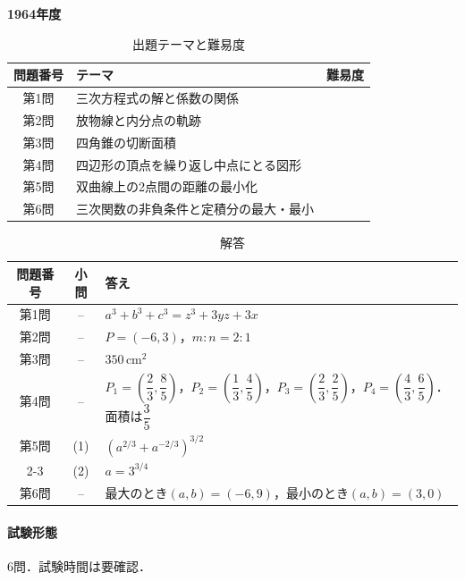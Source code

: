 \documentclass[../../main.tex]{subfiles}
\begin{document}
\begin{center}
  {\fontsize{48pt}{58pt}\selectfont \textbf{1964}\normalsize\textbf{年度}}
\end{center}

\begin{table}[htb]
  \centering
  \caption{出題テーマと難易度}
  \begin{tabular}{|c|p{9cm}|c|}
    \hline
    \textbf{問題番号} & \textbf{テーマ} & \textbf{難易度} \\
    \hline
    第1問 & 三次方程式の解と係数の関係 & \\
    \hline
    第2問 & 放物線と内分点の軌跡 & \\
    \hline
    第3問 & 四角錐の切断面積 & \\
    \hline
    第4問 & 四辺形の頂点を繰り返し中点にとる図形 & \\
    \hline
    第5問 & 双曲線上の2点間の距離の最小化 & \\
    \hline
    第6問 & 三次関数の非負条件と定積分の最大・最小 & \\
    \hline
  \end{tabular}
\end{table}

\begin{table}[htb]
  \centering
  \caption{解答}
  \renewcommand{\arraystretch}{1.4}
  \begin{tabular}{|c|c|p{9cm}|}
    \hline
    \textbf{問題番号} & \textbf{小問} & \textbf{答え} \\
    \hline
    第1問 & -- & $a^3+b^3+c^3=z^3+3yz+3x$ \\
    \hline
    第2問 & -- & $P=(-6,3)$，$m:n=2:1$ \\
    \hline
    第3問 & -- & $350\,\mathrm{cm^2}$ \\
    \hline
    第4問 & -- & $P_1=(\dfrac{2}{3},\dfrac{8}{5})$，$P_2=(\dfrac{1}{3},\dfrac{4}{5})$，$P_3=(\dfrac{2}{3},\dfrac{2}{5})$，$P_4=(\dfrac{4}{3},\dfrac{6}{5})$．面積は$\dfrac{3}{5}$ \\
    \hline
    第5問 & (1) & $(a^{2/3}+a^{-2/3})^{3/2}$ \\
    \cline{2-3}
    & (2) & $a=3^{3/4}$ \\
    \hline
    第6問 & -- & 最大のとき$(a,b)=(-6,9)$，最小のとき$(a,b)=(3,0)$ \\
    \hline
  \end{tabular}
\end{table}

\paragraph{試験形態}
6問．試験時間は要確認．
\end{document}

